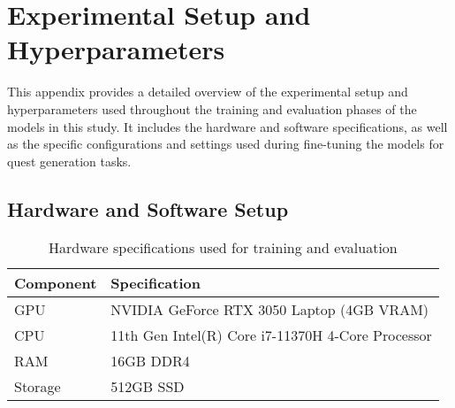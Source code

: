 \chapter{Experimental Setup and Hyperparameters}
\label{appendix:experimental-setup}

This appendix provides a detailed overview of the experimental setup and hyperparameters
used throughout the training and evaluation phases of the models in this study. It
includes the hardware and software specifications, as well as the specific configurations
and settings used during fine-tuning the models for quest generation tasks.

\section*{Hardware and Software Setup}

\begin{table}[t]
  \centering
  \scriptsize
  \renewcommand{\arraystretch}{1.3}
  \begin{tabularx}{0.95\textwidth}{
    >{\raggedright\arraybackslash}p{5cm}
    >{\centering\arraybackslash}X
  }
    \toprule
    \textbf{Component} & \textbf{Specification} \\
    \midrule
    GPU & NVIDIA GeForce RTX 3050 Laptop (4GB VRAM) \\
    CPU & 11th Gen Intel(R) Core i7-11370H 4-Core Processor \\
    RAM & 16GB DDR4 \\
    Storage & 512GB SSD \\
    \bottomrule
  \end{tabularx}
  \caption{Hardware specifications used for training and evaluation}
  \label{table:hardware}
\end{table}

